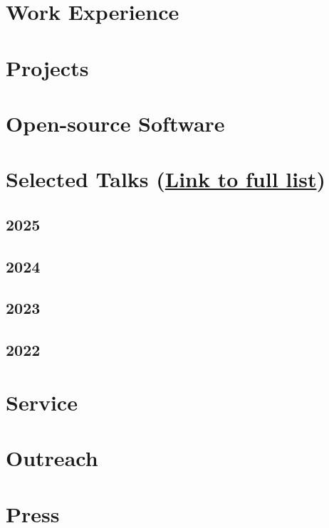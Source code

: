 \documentclass[a4paper,12pt]{article}
\begin{document}
\section{Work Experience}


\section{Projects}


\section{Open-source Software}


\section{Selected Talks (\href{https://www.ninamiolane.com/talks}{Link to full list})}

\subsection*{2025}
\subsection*{2024}
\subsection*{2023}
\subsection*{2022}

\section{Service}

\section{Outreach}


\section{Press}
\end{document}
